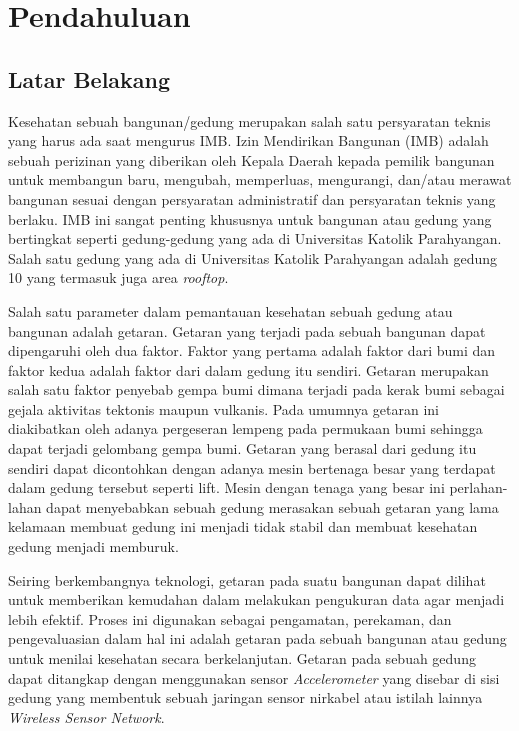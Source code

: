 \chapter{Pendahuluan}
\label{chap:intro}
   
\section{Latar Belakang}
\label{sec:label}

Kesehatan sebuah bangunan/gedung merupakan salah satu persyaratan teknis yang harus ada saat mengurus IMB. Izin Mendirikan Bangunan (IMB) adalah sebuah perizinan yang diberikan oleh Kepala Daerah kepada pemilik bangunan untuk membangun baru, mengubah, memperluas, mengurangi, dan/atau merawat bangunan sesuai dengan persyaratan administratif dan persyaratan teknis yang berlaku. IMB ini sangat penting khususnya untuk bangunan atau gedung yang bertingkat seperti gedung-gedung yang ada di Universitas Katolik Parahyangan. Salah satu gedung yang ada di Universitas Katolik Parahyangan adalah gedung 10 yang termasuk juga area \textit{rooftop}.


Salah satu parameter dalam pemantauan kesehatan sebuah gedung atau bangunan adalah getaran. Getaran yang terjadi pada sebuah bangunan dapat dipengaruhi oleh dua faktor. Faktor yang pertama adalah faktor dari bumi dan faktor kedua adalah faktor dari dalam gedung itu sendiri. Getaran merupakan salah satu faktor penyebab gempa bumi dimana terjadi pada kerak bumi sebagai gejala aktivitas tektonis maupun vulkanis. Pada umumnya getaran ini diakibatkan oleh adanya pergeseran lempeng pada permukaan bumi sehingga dapat terjadi gelombang gempa bumi. Getaran yang berasal dari gedung itu sendiri dapat dicontohkan dengan adanya mesin bertenaga besar yang terdapat dalam gedung tersebut seperti lift. Mesin dengan tenaga yang besar ini perlahan-lahan dapat menyebabkan sebuah gedung merasakan sebuah getaran yang lama kelamaan membuat gedung ini menjadi tidak stabil dan membuat kesehatan gedung menjadi memburuk. 

Seiring berkembangnya teknologi, getaran pada suatu bangunan dapat dilihat untuk memberikan kemudahan dalam melakukan pengukuran data agar menjadi lebih efektif. Proses ini digunakan sebagai pengamatan, perekaman, dan pengevaluasian dalam hal ini adalah getaran pada sebuah bangunan atau gedung untuk menilai kesehatan secara berkelanjutan. Getaran pada sebuah gedung dapat ditangkap dengan menggunakan sensor \textit{Accelerometer} yang disebar di sisi gedung yang membentuk sebuah jaringan sensor nirkabel atau istilah lainnya \textit{Wireless Sensor Network}.

